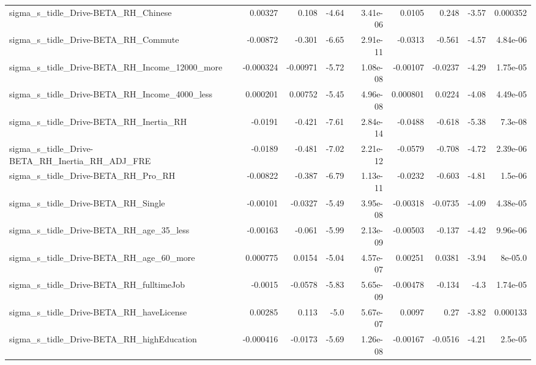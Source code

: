 \begin{tabular}{lrrrrrrrr}
sigma\_s\_tidle\_Drive-BETA\_RH\_Chinese                &     0.00327 &        0.108 &    -4.64 & 3.41e-06 &     0.0105 &       0.248 &        -3.57 &      0.000352 \\
sigma\_s\_tidle\_Drive-BETA\_RH\_Commute                &    -0.00872 &       -0.301 &    -6.65 & 2.91e-11 &    -0.0313 &      -0.561 &        -4.57 &      4.84e-06 \\
sigma\_s\_tidle\_Drive-BETA\_RH\_Income\_12000\_more      &   -0.000324 &     -0.00971 &    -5.72 & 1.08e-08 &   -0.00107 &     -0.0237 &        -4.29 &      1.75e-05 \\
sigma\_s\_tidle\_Drive-BETA\_RH\_Income\_4000\_less       &    0.000201 &      0.00752 &    -5.45 & 4.96e-08 &   0.000801 &      0.0224 &        -4.08 &      4.49e-05 \\
sigma\_s\_tidle\_Drive-BETA\_RH\_Inertia\_RH             &     -0.0191 &       -0.421 &    -7.61 & 2.84e-14 &    -0.0488 &      -0.618 &        -5.38 &       7.3e-08 \\
sigma\_s\_tidle\_Drive-BETA\_RH\_Inertia\_RH\_ADJ\_FRE     &     -0.0189 &       -0.481 &    -7.02 & 2.21e-12 &    -0.0579 &      -0.708 &        -4.72 &      2.39e-06 \\
sigma\_s\_tidle\_Drive-BETA\_RH\_Pro\_RH                 &    -0.00822 &       -0.387 &    -6.79 & 1.13e-11 &    -0.0232 &      -0.603 &        -4.81 &       1.5e-06 \\
sigma\_s\_tidle\_Drive-BETA\_RH\_Single                 &    -0.00101 &      -0.0327 &    -5.49 & 3.95e-08 &   -0.00318 &     -0.0735 &        -4.09 &      4.38e-05 \\
sigma\_s\_tidle\_Drive-BETA\_RH\_age\_35\_less            &    -0.00163 &       -0.061 &    -5.99 & 2.13e-09 &   -0.00503 &      -0.137 &        -4.42 &      9.96e-06 \\
sigma\_s\_tidle\_Drive-BETA\_RH\_age\_60\_more            &    0.000775 &       0.0154 &    -5.04 & 4.57e-07 &    0.00251 &      0.0381 &        -3.94 &       8e-05.0 \\
sigma\_s\_tidle\_Drive-BETA\_RH\_fulltimeJob            &     -0.0015 &      -0.0578 &    -5.83 & 5.65e-09 &   -0.00478 &      -0.134 &         -4.3 &      1.74e-05 \\
sigma\_s\_tidle\_Drive-BETA\_RH\_haveLicense            &     0.00285 &        0.113 &     -5.0 & 5.67e-07 &     0.0097 &        0.27 &        -3.82 &      0.000133 \\
sigma\_s\_tidle\_Drive-BETA\_RH\_highEducation          &   -0.000416 &      -0.0173 &    -5.69 & 1.26e-08 &   -0.00167 &     -0.0516 &        -4.21 &       2.5e-05 \\

\end{tabular}
